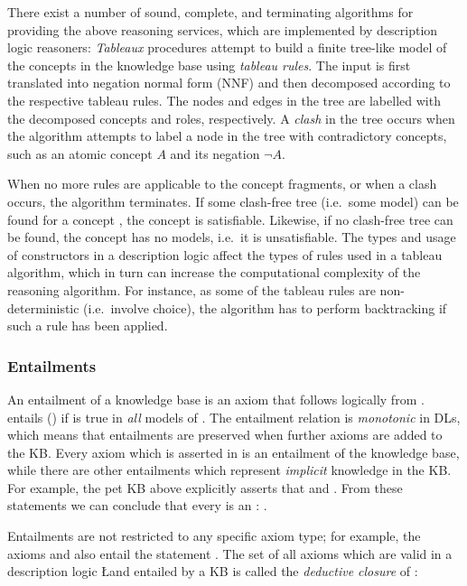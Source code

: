 There exist a number of sound, complete, and terminating algorithms for providing the above reasoning services, which are implemented by  description logic reasoners: \emph{Tableaux} \cite{de-giacomo96ez,horrocks97cf,horrocks00dy,baader00va} procedures attempt to build a finite tree-like model of the concepts in the knowledge base using \emph{tableau rules}. The input is first translated into negation normal form (NNF) and then decomposed according to the respective tableau rules. The nodes and edges in the tree are labelled with the decomposed concepts and roles, respectively. A \emph{clash} in the tree occurs when the algorithm attempts to label a node in the tree with contradictory concepts, such as an atomic concept $A$ and its negation $\neg A$.

When no more rules are applicable to the concept fragments, or when a clash occurs, the algorithm terminates. If some clash-free tree (i.e.\ some model) can be found for a concept , the concept is satisfiable. Likewise, if no clash-free tree can be found, the concept has no models, i.e.\ it is unsatisfiable. The types and usage of constructors in a description logic affect the types of rules used in a tableau algorithm, which in turn can increase the computational complexity of the reasoning algorithm. For instance, as some of the tableau rules are non-deterministic (i.e.\ involve choice), the algorithm has to perform backtracking if such a rule has been applied. 


\subsubsection{Entailments}

An entailment \ent of a knowledge base \K is an axiom that follows logically from \K. \K entails \ent (\K \entails \ent) if \ent is true in \emph{all} models \I of \K. The entailment relation is \emph{monotonic} in DLs, which means that entailments are preserved when further axioms are added to the KB. Every axiom which is asserted in \K is an entailment of the knowledge base, while there are other entailments which represent \emph{implicit} knowledge in the KB. For example, the pet KB above explicitly asserts that  and . From these statements we can conclude that every  is an : \K \entails {}. 

Entailments are not restricted to any specific axiom type; for example, the axioms  and  also entail the statement . The set of all axioms which are valid in a description logic \L and entailed by a KB \K is called the \emph{deductive closure} of \K:

